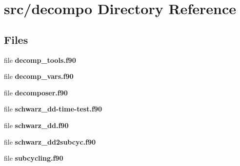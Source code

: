 \section{src/decompo Directory Reference}
\label{dir_58b8bbe30bfee1a6eaa462eb5db28d08}
\subsection*{Files}
\begin{DoxyCompactItemize}
\item 
file {\bf decomp\+\_\+tools.\+f90}
\item 
file {\bf decomp\+\_\+vars.\+f90}
\item 
file {\bf decomposer.\+f90}
\item 
file {\bf schwarz\+\_\+dd-\/time-\/test.\+f90}
\item 
file {\bf schwarz\+\_\+dd.\+f90}
\item 
file {\bf schwarz\+\_\+dd2subcyc.\+f90}
\item 
file {\bf subcycling.\+f90}
\end{DoxyCompactItemize}
